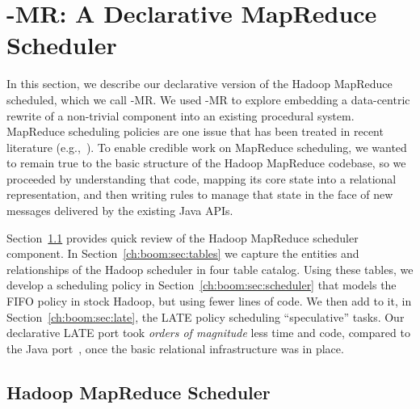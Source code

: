 
\section{\BOOM-MR: A Declarative MapReduce Scheduler}
\label{ch:boom:sec:port}

In this section, we describe our declarative version of the Hadoop MapReduce
scheduled, which we call \BOOM-MR.  We used \BOOM-MR to explore embedding a
data-centric rewrite of a non-trivial component into an existing procedural
system.  MapReduce scheduling policies are one issue that has been treated in
recent literature (e.g.,~\cite{zaharia-late,delay-sched}).  To enable credible
work on MapReduce scheduling, we wanted to remain true to the basic structure
of the Hadoop MapReduce codebase, so we proceeded by understanding that code,
mapping its core state into a relational representation, and then writing
\OVERLOG rules to manage that state in the face of new messages delivered by
the existing Java APIs.  

Section~\ref{ch:boom:sec:hadoop} provides quick review of the Hadoop MapReduce
scheduler component.  In Section~\ref{ch:boom:sec:tables} we capture the
entities and relationships of the Hadoop scheduler in four table catalog.
Using these tables, we develop a scheduling policy in
Section~\ref{ch:boom:sec:scheduler} that models the FIFO policy in stock
Hadoop, but using fewer lines of code.  We then add to it, in
Section~\ref{ch:boom:sec:late}, the LATE policy scheduling ``speculative''
tasks.  Our declarative LATE port took {\em orders of magnitude} less time and
code, compared to the Java port~\cite{jira-2141}, once the basic relational
infrastructure was in place.

\subsection{Hadoop MapReduce Scheduler}
\label{ch:boom:sec:hadoop}

